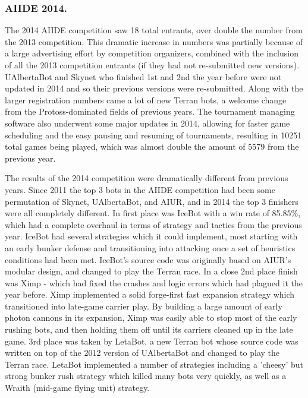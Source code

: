\documentclass{llncs}
\begin{document}
\subsubsection{AIIDE 2014.}

The 2014 AIIDE competition saw 18 total entrants, over double the number from the 2013 competition. This dramatic increase in numbers was partially because of a large advertising effort by competition organizers, combined with the inclusion of all the 2013 competition entrants (if they had not re-submitted new versions). UAlbertaBot and Skynet who finished 1st and 2nd the year before were not updated in 2014 and so their previous versions were re-submitted. Along with the larger registration numbers came a lot of new Terran bots, a welcome change from the Protoss-dominated fields of previous years. The tournament managing software also underwent some major updates in 2014, allowing for faster game scheduling and the easy pausing and resuming of tournaments, resulting in 10251 total games being played, which was almost double the amount of 5579 from the previous year.

The results of the 2014 competition were dramatically different from previous years. Since 2011 the top 3 bots in the AIIDE competition had been some permutation of Skynet, UAlbertaBot, and AIUR, and in 2014 the top 3 finishers were all completely different. In first place was IceBot with a win rate of 85.85\%, which had a complete overhaul in terms of strategy and tactics from the previous year. IceBot had several strategies which it could implement, most starting with an early bunker defense and transitioning into attacking once a set of heuristics conditions had been met. IceBot's source code was originally based on AIUR's modular design, and changed to play the Terran race. In a close 2nd place finish was Ximp - which had fixed the crashes and logic errors which had plagued it the year before. Ximp implemented a solid forge-first fast expansion strategy which transitioned into late-game carrier play. By building a large amount of early photon cannons in its expansion, Ximp was easily able to stop most of the early rushing bots, and then holding them off until its carriers cleaned up in the late game. 3rd place was taken by LetaBot, a new Terran bot whose source code was written on top of the 2012 version of UAlbertaBot and changed to play the Terran race. LetaBot implemented a number of strategies including a 'cheesy' but strong bunker rush strategy which killed many bots very quickly, as well as a Wraith (mid-game flying unit) strategy. 
\end{document}
